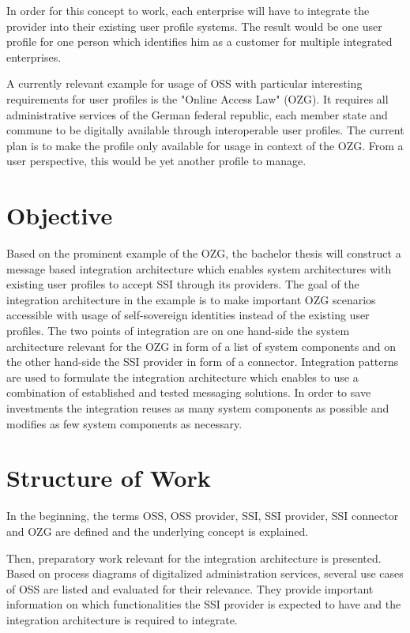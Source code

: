 \documentclass[
     12pt,         %
     a4paper,      %
     BCOR=10mm,version=first,     %
     DIV=14,version=first,        %
     ]{scrreprt}
\begin{document}
In order for this concept to work, each enterprise will have to integrate the provider into their existing user profile systems. The result would be one user profile for one person which identifies him as a customer for multiple integrated enterprises.

A currently relevant example for usage of OSS with particular interesting requirements for user profiles is the "Online Access Law" (OZG). It requires all administrative services of the German federal republic, each member state and commune to be digitally available through interoperable user profiles. The current plan is to make the profile only available for usage in context of the OZG. From a user perspective, this would be yet another profile to manage.

\chapter{Objective}
Based on the prominent example of the OZG, the bachelor thesis will construct a message based integration architecture which enables system architectures with existing user profiles to accept SSI through its providers.
The goal of the integration architecture in the example is to make important OZG scenarios accessible with usage of self-sovereign identities instead of the existing user profiles.
The two points of integration are on one hand-side the system architecture relevant for the OZG in form of a list of system components and on the other hand-side the SSI provider in form of a connector.
Integration patterns are used to formulate the integration architecture which enables to use a combination of established and tested messaging solutions. In order to save investments the integration reuses as many system components as possible and modifies as few system components as necessary.

\chapter{Structure of Work}

In the beginning, the terms OSS, OSS provider, SSI, SSI provider, SSI connector and OZG are defined and the underlying concept is explained.

Then, preparatory work relevant for the integration architecture is presented. Based on process diagrams of digitalized administration services, several use cases of OSS are listed and evaluated for their relevance. They provide important information on which functionalities the SSI provider is expected to have and the integration architecture is required to integrate.
\end{document}
